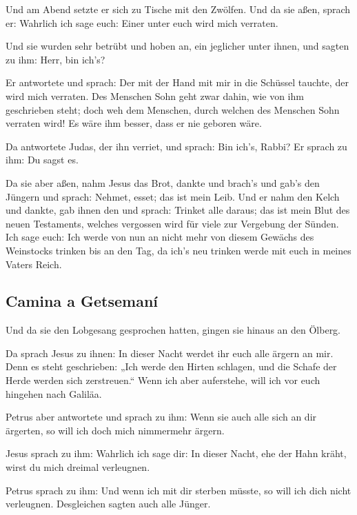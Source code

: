  Und am Abend setzte er sich zu Tische mit den Zwölfen.
 Und da sie aßen, sprach er: Wahrlich ich sage euch:
Einer unter euch wird mich verraten.

 Und sie wurden sehr betrübt und hoben an, ein jeglicher
unter ihnen, und sagten zu ihm: Herr, bin ich's?

 Er antwortete und sprach: Der mit der Hand mit mir in
die Schüssel tauchte, der wird mich verraten.  Des
Menschen Sohn geht zwar dahin, wie von ihm geschrieben steht; doch weh
dem Menschen, durch welchen des Menschen Sohn verraten wird! Es wäre ihm
besser, dass er nie geboren wäre.

 Da antwortete Judas, der ihn verriet, und sprach: Bin
ich's, Rabbi? Er sprach zu ihm: Du sagst es.

 Da sie aber aßen, nahm Jesus das Brot, dankte und
brach's und gab's den Jüngern und sprach: Nehmet, esset; das ist mein
Leib.  Und er nahm den Kelch und dankte, gab ihnen den
und sprach: Trinket alle daraus;  das ist mein Blut des
neuen Testaments, welches vergossen wird für viele zur Vergebung der
Sünden.  Ich sage euch: Ich werde von nun an nicht mehr
von diesem Gewächs des Weinstocks trinken bis an den Tag, da ich's neu
trinken werde mit euch in meines Vaters Reich.

\hypertarget{camina-a-getsemanuxed}{%
\subsection{Camina a Getsemaní}\label{camina-a-getsemanuxed}}

 Und da sie den Lobgesang gesprochen hatten, gingen sie
hinaus an den Ölberg.

 Da sprach Jesus zu ihnen: In dieser Nacht werdet ihr
euch alle ärgern an mir. Denn es steht geschrieben: „Ich werde den
Hirten schlagen, und die Schafe der Herde werden sich zerstreuen.``
 Wenn ich aber auferstehe, will ich vor euch hingehen
nach Galiläa.

 Petrus aber antwortete und sprach zu ihm: Wenn sie auch
alle sich an dir ärgerten, so will ich doch mich nimmermehr ärgern.

 Jesus sprach zu ihm: Wahrlich ich sage dir: In dieser
Nacht, ehe der Hahn kräht, wirst du mich dreimal verleugnen.

 Petrus sprach zu ihm: Und wenn ich mit dir sterben
müsste, so will ich dich nicht verleugnen. Desgleichen sagten auch alle
Jünger.

